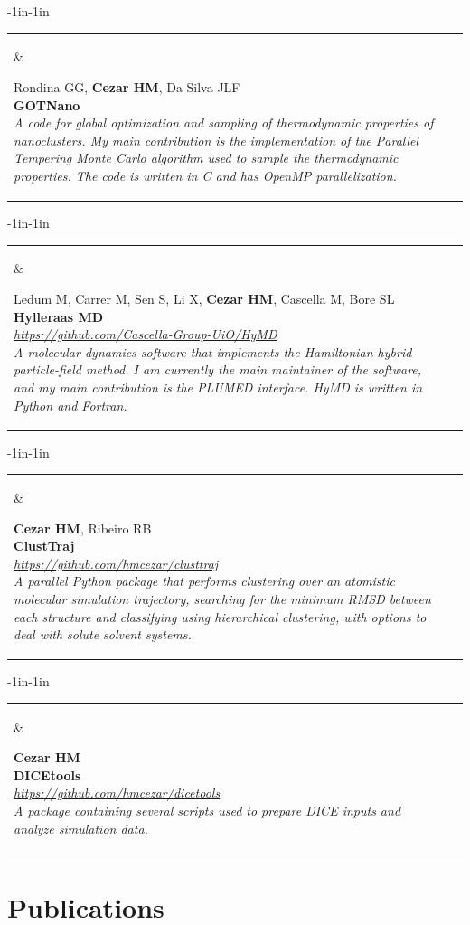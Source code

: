 \documentclass[10pt]{article}
\newcommand{\newsoftware}[3]{
\begin{adjustwidth}{-1in}{-1in}  
\begin{tabular}{p{0.9in}p{7in}}
\parbox[c]{0.9in}{} & \parbox[c]{6in}{\setstretch{0.9} {\scriptsize {#1}} \\ {\bf #2}  \\ {\footnotesize\emph {#3}}}
\end{tabular}
\end{adjustwidth}
\vspace{0.2in}
}
\begin{document}
\newsoftware{Rondina GG, \textbf{Cezar HM}, Da Silva JLF}{GOTNano}{ 
A code for global optimization and sampling of thermodynamic properties of nanoclusters. My main contribution is the implementation of the Parallel Tempering Monte Carlo algorithm used to sample the thermodynamic properties. The code is written in C and has OpenMP parallelization.}

\newsoftware{Ledum M, Carrer M, Sen S, Li X, \textbf{Cezar HM}, Cascella M, Bore SL}{Hylleraas MD}{\href{https://github.com/Cascella-Group-UiO/HyMD}{https://github.com/Cascella-Group-UiO/HyMD} \\ 
A molecular dynamics software that implements the Hamiltonian hybrid particle-field method. I am currently the main maintainer of the software, and my main contribution is the PLUMED interface. HyMD is written in Python and Fortran.}

\newsoftware{\textbf{Cezar HM}, Ribeiro RB}{ClustTraj}{\href{https://github.com/hmcezar/clusttraj}{https://github.com/hmcezar/clusttraj} \\ 
A parallel Python package that performs clustering over an atomistic molecular simulation trajectory, searching for the minimum RMSD between each structure and classifying using hierarchical clustering, with options to deal with solute solvent systems.}

\newsoftware{\textbf{Cezar HM}}{DICEtools}{\href{https://github.com/hmcezar/dicetools}{https://github.com/hmcezar/dicetools} \\ 
A package containing several scripts used to prepare DICE inputs and analyze simulation data.}




\section*{Publications}
\end{document}
